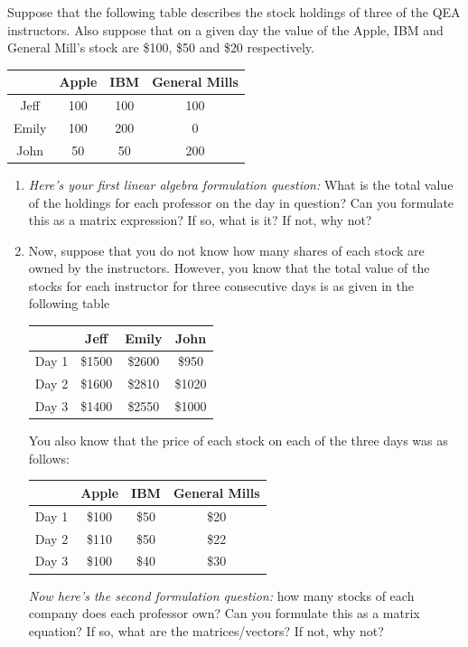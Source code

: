 \begin{prob}
Suppose that the following table describes the stock holdings of three of the QEA instructors. Also suppose that on a given day the value of the Apple, IBM and General Mill's stock are \$100, \$50 and \$20 respectively.
\vspace{0.5cm}\\
\begin{center}
\begin{tabular}{|c|c|c|c|}
  \hline
     & Apple & IBM & General Mills \\
 \hline
  Jeff & 100 & 100 & 100 \\
  Emily & 100 & 200 & 0 \\
  John & 50 & 50 & 200 \\
  \hline
\end{tabular}
\end{center}

\begin{enumerate}
\item \textit{Here's your first linear algebra formulation question:} What is the total value of the holdings for each professor on the day in question?  Can you formulate this as a matrix expression?  If so, what is it? If not, why not?

\item Now, suppose that you do not know how many shares of each stock are owned by the instructors. However, you know that the total value of the stocks for each instructor for three consecutive days is as given in the following table

\begin{center}
    \begin{tabular}{|c|c|c|c|}
    \hline
        & Jeff & Emily & John \\
        \hline
        Day 1 & \$1500 & \$2600 & \$950 \\
        Day 2 & \$1600 & \$2810 & \$1020 \\
        Day 3 & \$1400 & \$2550 & \$1000 \\
        \hline
    \end{tabular}
\end{center}

You also know that  the price of each stock on each of the three days was as follows:
\begin{center}
    \begin{tabular}{|c|c|c|c|}
    \hline
    & Apple & IBM & General Mills\\
    \hline
    Day 1 & \$100 & \$50 & \$20 \\
    Day 2 & \$110 & \$50 & \$22 \\
    Day 3 & \$100 & \$40 & \$30 \\
    \hline
    \end{tabular}
\end{center}

\textit{Now here's the second formulation question:} how many stocks of each company does each professor own?  Can you formulate this as a matrix equation?  If so, what are the matrices/vectors? If not, why not?

\end{enumerate}
\end{prob}

